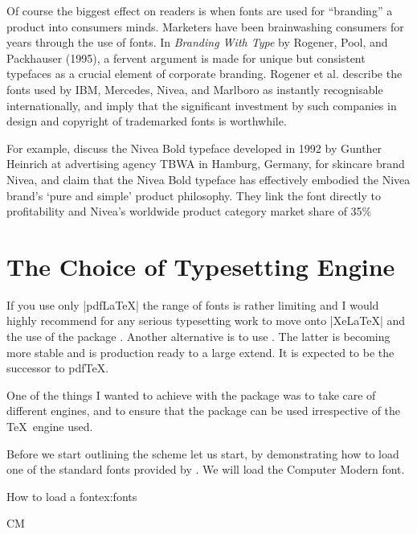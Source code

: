 Of course the biggest effect on readers is when fonts are used for ``branding'' a product into consumers minds. 
Marketers have been brainwashing
consumers for years through the use of fonts. In \textit{Branding
With Type}  by Rogener, Pool, and Packhauser
(1995), a fervent argument is made for unique
but consistent typefaces as a crucial element of
corporate branding. Rogener et al. describe the
fonts used by IBM, Mercedes, Nivea, and
Marlboro as instantly recognisable
internationally, and imply that the significant
investment by such companies in design and
copyright of trademarked fonts is worthwhile. 

For example, \citep{rogener1995} discuss the Nivea
Bold typeface developed in 1992 by Gunther
Heinrich at advertising agency \textsc{TBWA} in
Hamburg, Germany, for skincare brand Nivea,
and claim that the Nivea Bold typeface has
effectively embodied the Nivea brand’s `pure
and simple’ product philosophy. They link the
font directly to profitability and Nivea’s
worldwide product category market share of
35\% \citep[p. 91]{rogener1995} 


\section{The Choice of Typesetting Engine}

If you use only |pdfLaTeX| the range of fonts is rather limiting and I would highly recommend for any serious typesetting work to move onto |XeLaTeX| and the use of the package  \citep{fontspec}. Another alternative is to use \lualatex. The latter is becoming more stable and is production ready to a large extend. It is expected to be the successor to pdfTeX.

One of the things I wanted to achieve with the  package was  to take care of different \tex engines, and to ensure that the package can be used irrespective of the \TeX\ engine used. 

Before we start outlining the scheme let us start, by demonstrating how to load one of the standard fonts provided by \latexe. We will load the Computer Modern font. 

\begin{texexample}{How to load a font}{ex:fonts}
\newcommand{\fontdemo}[4][OT1]{
    \leavevmode
    \textcolor{thefontname}{#2}
    \fontencoding{#1}\fontfamily{#3}\selectfont#4 }

\fontdemo{CM}{cmtt}{ \alphabet\par}

\fox
\end{texexample}

